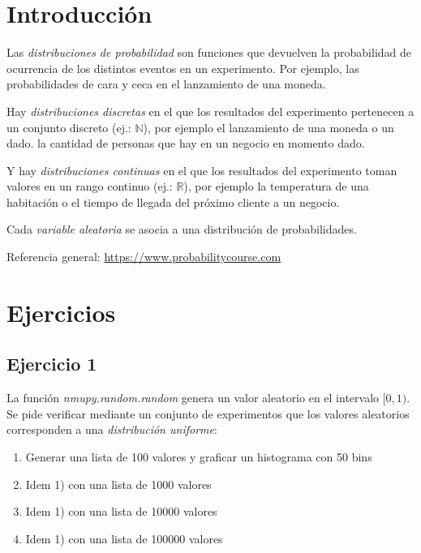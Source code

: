 \documentclass[a4paper]{article}
\begin{document}

\section{Introducción}

Las \emph{distribuciones de probabilidad} son funciones que devuelven 
la probabilidad de ocurrencia de los distintos eventos en un 
experimento. Por ejemplo, las probabilidades de cara y ceca en el 
lanzamiento de una moneda.

\bigskip

Hay \emph{distribuciones discretas} en el que los resultados del experimento 
pertenecen a un conjunto discreto (ej.: $\mathbb{N}$), por ejemplo el lanzamiento de una 
moneda o un dado. la cantidad de personas que hay en un negocio en 
momento dado.

\bigskip

Y hay \emph{distribuciones continuas} en el que los resultados del 
experimento toman valores en un rango continuo (ej.: $\mathbb{R}$), por ejemplo la 
temperatura de una habitación o el tiempo de llegada del próximo 
cliente a un negocio.

\bigskip

Cada \emph{variable aleatoria} se asocia a una distribución de 
probabilidades. 

\bigskip

Referencia general: \url{https://www.probabilitycourse.com}

\section{Ejercicios}

\subsection{Ejercicio 1}

La función \emph{nmupy.random.random} genera un valor  
aleatorio en el intervalo $[0,1)$. Se pide verificar mediante un 
conjunto de experimentos que los valores aleatorios corresponden a una 
\emph{distribución uniforme}:

\begin{enumerate}
\item Generar una lista de 100 valores y graficar un histograma con 50 
bins
\item Idem 1) con una lista de 1000 valores
\item Idem 1) con una lista de 10000 valores
\item Idem 1) con una lista de 100000 valores
\end{enumerate}
\end{document}
